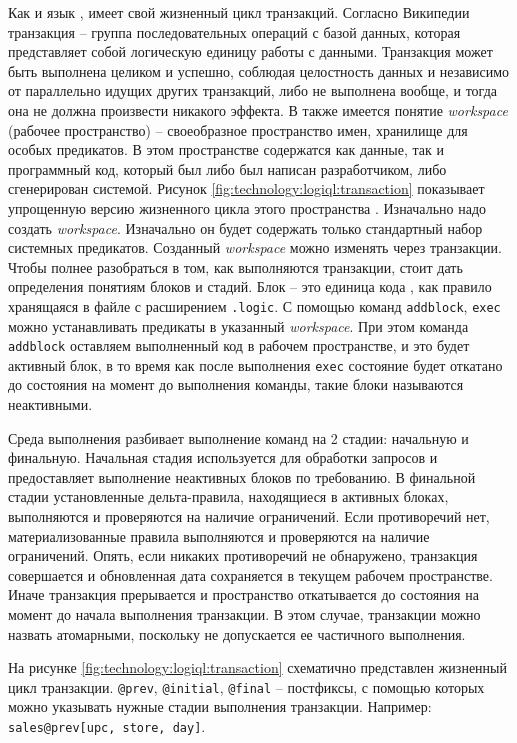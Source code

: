 Как и язык \sql, \logiql имеет свой жизненный цикл транзакций. Согласно Википедии \cite{transaction_definition} транзакция – группа последовательных операций с базой данных, которая представляет собой логическую единицу работы с данными. Транзакция может быть выполнена целиком и успешно, соблюдая целостность данных и независимо от параллельно идущих других транзакций, либо не выполнена вообще, и тогда она не должна произвести никакого эффекта.
В \logiql также имеется понятие \emph{workspace} (рабочее пространство) – своеобразное пространство имен, хранилище для особых предикатов. В этом пространстве содержатся как данные, так и программный код, который был либо был написан разработчиком, либо сгенерирован системой. Рисунок \ref{fig:technology:logiql:transaction} показывает упрощенную версию жизненного цикла этого пространства \cite{query_language_for_smart_db}.
Изначально надо создать \emph{workspace}. Изначально он будет содержать только стандартный набор системных предикатов. Созданный \emph{workspace} можно изменять через транзакции.
Чтобы полнее разобраться в том, как выполняются транзакции, стоит дать определения понятиям блоков и стадий. Блок – это единица кода \logiql, как правило хранящаяся в файле с расширением \lstinline{.logic}. С помощью команд \lstinline{addblock}, \lstinline{exec} можно устанавливать предикаты в указанный \emph{workspace}. При этом команда \lstinline{addblock} оставляем выполненный код в рабочем пространстве, и это будет активный блок, в то время как после выполнения \lstinline{exec} состояние будет откатано до состояния на момент до выполнения команды, такие блоки называются неактивными.

Среда выполнения \logiql разбивает выполнение команд на 2 стадии: начальную и финальную. Начальная стадия используется для обработки запросов и предоставляет выполнение неактивных блоков по требованию. В финальной стадии установленные дельта-правила, находящиеся в активных блоках, выполняются и проверяются на наличие ограничений. Если противоречий нет, материализованные правила выполняются и проверяются на наличие ограничений. Опять, если никаких противоречий не обнаружено, транзакция совершается и обновленная дата сохраняется в текущем рабочем пространстве. Иначе транзакция прерывается и пространство откатывается до состояния на момент до начала выполнения транзакции. В этом случае, транзакции можно назвать атомарными, поскольку не допускается ее частичного выполнения.

На рисунке \ref{fig:technology:logiql:transaction} схематично представлен жизненный цикл транзакции. \lstinline{@prev}, \lstinline{@initial}, \lstinline{@final} – постфиксы, с помощью которых можно
указывать нужные стадии выполнения транзакции. Например:
\lstinline{sales@prev[upc, store, day]}.

